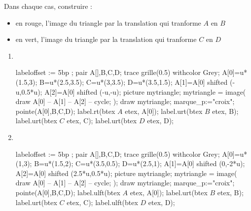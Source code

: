 \begin{exercice*}
    Dans chaque cas, construire :
    \begin{itemize}
        \item en rouge, l'image du triangle par la translation qui tranforme $A$ en $B$
        \item en vert, l'image du triangle par la translation qui tranforme $C$ en $D$
    \end{itemize}
            \begin{enumerate}
                \item \phantom{rrr}\\
                \begin{Geometrie}[CoinHD={(4u,4u)}]
                    labeloffset := 5bp ;
                    pair A[],B,C,D;                    
                    trace grille(0.5) withcolor Grey;
                    A[0]=u*(1.5,3);
                    B=u*(2.5,3.5);
                    C=u*(3,3.5);
                    D=u*(3.5,1.5);
                    A[1]=A[0] shifted (-u,0.5*u);
                    A[2]=A[0] shifted (-u,-u);
                    picture mytriangle;
                    mytriangle = image( 
                        draw A[0] -- A[1] -- A[2] -- cycle;
                    );
                    draw mytriangle;
                    marque_p:="croix";
                    pointe(A[0],B,C,D);
                    label.rt(btex $A$ etex, A[0]);
                    label.urt(btex $B$ etex, B);
                    label.urt(btex $C$ etex, C);
                    label.urt(btex $D$ etex, D);
                \end{Geometrie}
                \item \phantom{rrr}\\
                \begin{Geometrie}[CoinHD={(4u,4u)}]
                    labeloffset := 5bp ;
                    pair A[],B,C,D;
                    trace grille(0.5) withcolor Grey;
                    A[0]=u*(1,3);
                    B=u*(1.5,2);
                    C=u*(3.5,0.5);
                    D=u*(2.5,1);
                    A[1]=A[0] shifted (0,-2*u);
                    A[2]=A[0] shifted (2.5*u,0.5*u);
                    picture mytriangle;
                    mytriangle = image( 
                        draw A[0] -- A[1] -- A[2] -- cycle;
                    );
                    draw mytriangle;
                    marque_p:="croix";
                    pointe(A[0],B,C,D);
                    label.ulft(btex $A$ etex, A[0]);
                    label.urt(btex $B$ etex, B);
                    label.urt(btex $C$ etex, C);
                    label.ulft(btex $D$ etex, D);                                      
                \end{Geometrie}
            \end{enumerate}
\end{exercice*}

